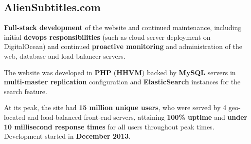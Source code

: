 \documentclass[11pt,a4paper,sans]{moderncv}
\begin{document}
	\subsection{AlienSubtitles.com}

		\textbf{Full-stack development} of the website and continued maintenance, including initial \textbf{devops responsibilities} (such as cloud server deployment on DigitalOcean) and continued \textbf{proactive monitoring} and administration of the web, database and load-balancer servers.

		The website was developed in \textbf{PHP} (\textbf{HHVM}) backed by \textbf{MySQL} servers in \textbf{multi-master replication} configuration and \textbf{ElasticSearch} instances for the search feature.

		At its peak, the site had \textbf{15 million unique users}, who were served by 4 geo-located and load-balanced front-end servers, attaining \textbf{100\% uptime} and \textbf{under 10 millisecond response times} for all users throughout peak times. Development started in \textbf{December 2013}.
\end{document}
